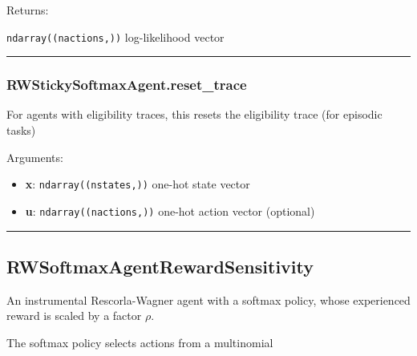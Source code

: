 Returns:

\texttt{ndarray((nactions,))} log-likelihood vector

\begin{center}\rule{0.5\linewidth}{\linethickness}\end{center}

\subsubsection{RWStickySoftmaxAgent.reset\_trace}\label{rwstickysoftmaxagent.reset_trace}

\begin{Shaded}
\begin{Highlighting}[]
\OperatorTok{=}\NormalTok{)}
\end{Highlighting}
\end{Shaded}

For agents with eligibility traces, this resets the eligibility trace
(for episodic tasks)

Arguments:

\begin{itemize}
\tightlist
\item
  \textbf{x}: \texttt{ndarray((nstates,))} one-hot state vector
\item
  \textbf{u}: \texttt{ndarray((nactions,))} one-hot action vector
  (optional)
\end{itemize}

\begin{center}\rule{0.5\linewidth}{\linethickness}\end{center}

\subsection{RWSoftmaxAgentRewardSensitivity}\label{rwsoftmaxagentrewardsensitivity}

\begin{Shaded}
\begin{Highlighting}[]
\end{Highlighting}
\end{Shaded}

An instrumental Rescorla-Wagner agent with a softmax policy, whose
experienced reward is scaled by a factor \(\rho\).

The softmax policy selects actions from a multinomial

